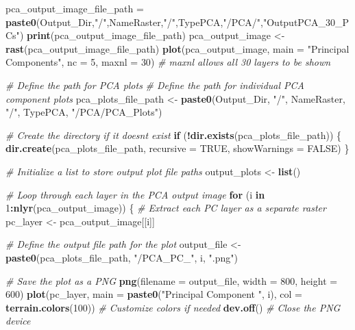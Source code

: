 \documentclass[
]{article}
\newenvironment{Shaded}{\begin{snugshade}}{\end{snugshade}}
\newcommand{\AttributeTok}[1]{\textcolor[rgb]{0.13,0.29,0.53}{#1}}
\newcommand{\CommentTok}[1]{\textcolor[rgb]{0.56,0.35,0.01}{\textit{#1}}}
\newcommand{\ConstantTok}[1]{\textcolor[rgb]{0.56,0.35,0.01}{#1}}
\newcommand{\ControlFlowTok}[1]{\textcolor[rgb]{0.13,0.29,0.53}{\textbf{#1}}}
\newcommand{\DecValTok}[1]{\textcolor[rgb]{0.00,0.00,0.81}{#1}}
\newcommand{\FunctionTok}[1]{\textcolor[rgb]{0.13,0.29,0.53}{\textbf{#1}}}
\newcommand{\NormalTok}[1]{#1}
\newcommand{\OtherTok}[1]{\textcolor[rgb]{0.56,0.35,0.01}{#1}}
\newcommand{\SpecialCharTok}[1]{\textcolor[rgb]{0.81,0.36,0.00}{\textbf{#1}}}
\newcommand{\StringTok}[1]{\textcolor[rgb]{0.31,0.60,0.02}{#1}}
\begin{document}
\begin{Shaded}
\begin{Highlighting}[]
\NormalTok{pca\_output\_image\_file\_path }\OtherTok{=} \FunctionTok{paste0}\NormalTok{(Output\_Dir,}\StringTok{"/"}\NormalTok{,NameRaster,}\StringTok{"/"}\NormalTok{,TypePCA,}\StringTok{"/PCA/"}\NormalTok{,}\StringTok{"OutputPCA\_30\_PCs"}\NormalTok{)}
\FunctionTok{print}\NormalTok{(pca\_output\_image\_file\_path)}
\NormalTok{pca\_output\_image }\OtherTok{\textless{}{-}} \FunctionTok{rast}\NormalTok{(pca\_output\_image\_file\_path)}
\FunctionTok{plot}\NormalTok{(pca\_output\_image, }\AttributeTok{main =} \StringTok{"Principal Components"}\NormalTok{, }\AttributeTok{nc =} \DecValTok{5}\NormalTok{, }\AttributeTok{maxnl =} \DecValTok{30}\NormalTok{)  }\CommentTok{\# maxnl allows all 30 layers to be shown}


\CommentTok{\# Define the path for PCA plots}
\CommentTok{\# Define the path for individual PCA component plots}
\NormalTok{pca\_plots\_file\_path }\OtherTok{\textless{}{-}} \FunctionTok{paste0}\NormalTok{(Output\_Dir, }\StringTok{"/"}\NormalTok{, NameRaster, }\StringTok{"/"}\NormalTok{, TypePCA, }\StringTok{"/PCA/PCA\_Plots"}\NormalTok{)}

\CommentTok{\# Create the directory if it doesn\textquotesingle{}t exist}
\ControlFlowTok{if}\NormalTok{ (}\SpecialCharTok{!}\FunctionTok{dir.exists}\NormalTok{(pca\_plots\_file\_path)) \{}
  \FunctionTok{dir.create}\NormalTok{(pca\_plots\_file\_path, }\AttributeTok{recursive =} \ConstantTok{TRUE}\NormalTok{, }\AttributeTok{showWarnings =} \ConstantTok{FALSE}\NormalTok{)}
\NormalTok{\}}

\CommentTok{\# Initialize a list to store output plot file paths}
\NormalTok{output\_plots }\OtherTok{\textless{}{-}} \FunctionTok{list}\NormalTok{()}

\CommentTok{\# Loop through each layer in the PCA output image}
\ControlFlowTok{for}\NormalTok{ (i }\ControlFlowTok{in} \DecValTok{1}\SpecialCharTok{:}\FunctionTok{nlyr}\NormalTok{(pca\_output\_image)) \{}
  \CommentTok{\# Extract each PC layer as a separate raster}
\NormalTok{  pc\_layer }\OtherTok{\textless{}{-}}\NormalTok{ pca\_output\_image[[i]]}

  \CommentTok{\# Define the output file path for the plot}
\NormalTok{  output\_file }\OtherTok{\textless{}{-}} \FunctionTok{paste0}\NormalTok{(pca\_plots\_file\_path, }\StringTok{"/PCA\_PC\_"}\NormalTok{, i, }\StringTok{".png"}\NormalTok{)}

  \CommentTok{\# Save the plot as a PNG}
  \FunctionTok{png}\NormalTok{(}\AttributeTok{filename =}\NormalTok{ output\_file, }\AttributeTok{width =} \DecValTok{800}\NormalTok{, }\AttributeTok{height =} \DecValTok{600}\NormalTok{)}
  \FunctionTok{plot}\NormalTok{(pc\_layer,}
       \AttributeTok{main =} \FunctionTok{paste0}\NormalTok{(}\StringTok{"Principal Component "}\NormalTok{, i),}
       \AttributeTok{col =} \FunctionTok{terrain.colors}\NormalTok{(}\DecValTok{100}\NormalTok{))  }\CommentTok{\# Customize colors if needed}
  \FunctionTok{dev.off}\NormalTok{()  }\CommentTok{\# Close the PNG device}


\end{Highlighting}
\end{Shaded}
\end{document}
